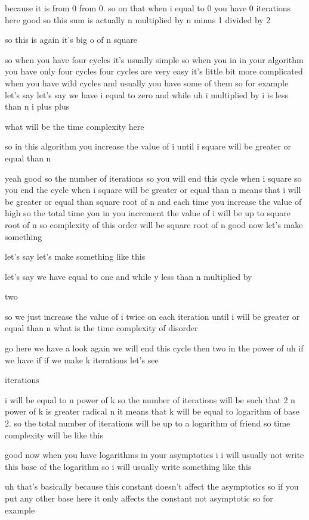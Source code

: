 because it is from 0 from 0. so on that when i equal to 0 you have 0 iterations here good so this sum is actually n multiplied by n minus 1 divided by 2

so this is again it's big o of n square

so when you have four cycles it's usually simple so when you in in your algorithm you have only four cycles four cycles are very easy it's little bit more complicated when you have wild cycles and usually you have some of them so for example let's say let's say we have i equal to zero and while uh i multiplied by i is less than n i plus plus

what will be the time complexity here

so in this algorithm you increase the value of i until i square will be greater or equal than n

yeah good so the number of iterations so you will end this cycle when i square so you end the cycle when i square will be greater or equal than n means that i will be greater or equal than square root of n and each time you increase the value of high so the total time you in you increment the value of i will be up to square root of n so complexity of this order will be square root of n good now let's make something

let's say let's make something like this

let's say we have equal to one and while y less than n multiplied by

two

so we just increase the value of i twice on each iteration until i will be greater or equal than n what is the time complexity of disorder

go here we have a look again we will end this cycle then two in the power of uh if we have if if we make k iterations let's see

iterations

i will be equal to n power of k so the number of iterations will be such that 2 n power of k is greater radical n it means that k will be equal to logarithm of base 2. so the total number of iterations will be up to a logarithm of friend so time complexity will be like this

good now when you have logarithms in your asymptotics i i will usually not write this base of the logarithm so i will usually write something like this

uh that's basically because this constant doesn't affect the asymptotics so if you put any other base here it only affects the constant not asymptotic so for example

